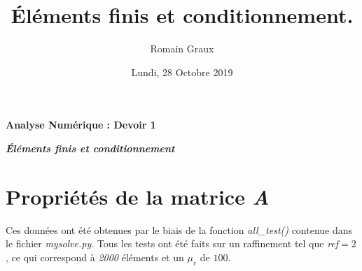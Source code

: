 \documentclass{article}[11pt]
\title{Éléments finis et conditionnement.}
\author{Romain Graux}
\date{Lundi, 28 Octobre 2019}
\newcommand{\python}[1]{\textcolor{pythonColor}{\textit{#1}}}
\begin{document}
\raggedbottom
{}
\pagestyle{fancy}
\begin{center}
    \huge{{\textbf{Analyse Numérique : Devoir 1}}}
    
    \Huge{\textit{\textbf{Éléments finis et conditionnement}}}
\end{center}
\vspace{0.7cm}

\section{Propriétés de la matrice \textit{A}}

Ces données ont été obtenues par le biais de la fonction \python{all\_test}\textit{()} contenue dans le fichier \textit{mysolve.py}. Tous les tests ont été faits sur un raffinement tel que \python{ref}$ = 2$, ce qui correspond à \textit{2000} éléments et un \python{$\mu_r$} de $100$.
\end{document}
